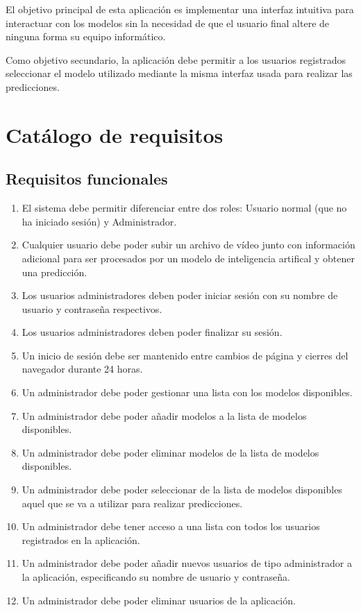 El objetivo principal de esta aplicación es implementar una interfaz intuitiva
para interactuar con los modelos sin la necesidad de que el usuario final altere
de ninguna forma su equipo informático.

Como objetivo secundario, la aplicación debe permitir a los usuarios registrados
seleccionar el modelo utilizado mediante la misma interfaz usada para realizar
las predicciones.

\section{Catálogo de requisitos}

\subsection{Requisitos funcionales}

\begin{enumerate}[start=1,label={\bfseries RF\arabic*:}]
    \item El sistema debe permitir diferenciar entre dos roles: Usuario normal
          (que no ha iniciado sesión) y Administrador.
    \item Cualquier usuario debe poder subir un archivo de vídeo junto con
          información adicional para ser procesados por un modelo de
          inteligencia artifical y obtener una predicción.
    \item Los usuarios administradores deben poder iniciar sesión con su nombre
          de usuario y contraseña respectivos.
    \item Los usuarios administradores deben poder finalizar su sesión.
    \item Un inicio de sesión debe ser mantenido entre cambios de página y
          cierres del navegador durante 24 horas.
    \item Un administrador debe poder gestionar una lista con los modelos
          disponibles.
    \item Un administrador debe poder añadir modelos a la lista de modelos
          disponibles.
    \item Un administrador debe poder eliminar modelos de la lista de modelos
          disponibles.
    \item Un administrador debe poder seleccionar de la lista de modelos
          disponibles aquel que se va a utilizar para realizar predicciones.
    \item Un administrador debe tener acceso a una lista con todos los usuarios
          registrados en la aplicación.
    \item Un administrador debe poder añadir nuevos usuarios de tipo
          administrador a la aplicación, especificando su nombre de usuario y
          contraseña.
    \item Un administrador debe poder eliminar usuarios de la aplicación.
\end{enumerate}

